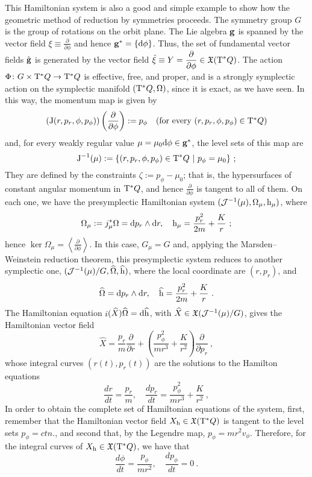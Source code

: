 \documentclass[12pt]{report}
\def\dst{\displaystyle}
\def\derpar#1#2{\frac{\partial{#1}}{\partial{#2}}}
\def\vf{\mathfrak X}
\def\d{{\rm d}}
\def\Tan{{\rm T}}
\def\inn{\mathop{i}\nolimits}
\begin{document}
This Hamiltonian system is also a good and simple example to show how the geometric method of reduction by symmetries proceeds.
The symmetry group $G$ is the group of rotations on the orbit plane.
The Lie algebra ${\bf g}$ is spanned by the vector field
$\displaystyle\xi\equiv\derpar{}{\phi}$ and hence ${\bf g}^*=\{\d\phi\}$.
Thus, the set of fundamental vector fields $\tilde{\bf g}$ is generated by
the vector field $\displaystyle\tilde\xi\equiv Y=\derpar{}{\phi}\in\vf(\Tan^*Q)$.
The action $\Phi\colon G\times\Tan^*Q\to\Tan^*Q$ is effective, free, and proper,
and is a strongly symplectic action on the symplectic manifold $(\Tan^*Q,\Omega)$, since it is exact, as we have seen.
In this way, the momentum map is given by
$$
({\rm J}(r,p_r,\phi,p_\phi))\left(\derpar{}{\phi}\right):=p_\phi
\quad \mbox{\rm (for every $(r,p_r,\phi,p_\phi)\in\Tan^*Q$)}
$$
and, for every weakly regular value
$\mu =\mu_0\d\phi\in{\bf g}^*$, the level sets of this map are
$$
{\rm J}^{-1}(\mu):=\{ (r,p_r,\phi,p_\phi)\in\Tan^*Q\ \vert\ p_\phi=\mu_0\} \ ;
$$
They are defined by the constraints $\zeta :=p_\phi-\mu_0$;
that is, the hypersurfaces of constant angular momentum in $\Tan^*Q$,
and hence $\dst\derpar{}{\phi}$ is tangent to all of them.
On each one, we have the presymplectic Hamiltonian system
$({\cal J}^{-1}(\mu),\Omega_\mu,{\rm h}_\mu)$, where
$$
\Omega_\mu :=j_\mu^*\Omega=\d p_r\wedge\d r
,\quad
{\rm h}_\mu=\frac{p_r^2}{2m}+\frac{K}{r} \ ;
$$
hence $\displaystyle\ker\Omega_\mu=\left\langle\derpar{}{\phi}\right\rangle$.
In this case, $G_\mu=G$ and, applying the Marsden--Weinstein reduction theorem,
this presymplectic system reduces to another symplectic one,
$({\cal J}^{-1}(\mu )/G,\widehat\Omega,\widehat{\rm h})$,
where the local coordinate are $(r,p_r)$, and
$$
\widehat\Omega =\d p_r\wedge\d r
,\quad
\widehat{\rm h}=\frac{p_r^2}{2m}+\frac{K}{r} \ .
$$
The Hamiltonian equation $\inn(\widehat X)\widehat\Omega =\d\widehat{\rm h}$,
with $\widehat X\in\vf({\cal J}^{-1}(\mu)/G)$,
gives the Hamiltonian vector field
$$
\widehat X=\frac{p_r}{m}\derpar{}{r}+\left(\frac{p_\phi^2}{mr^3}+\frac{K}{r^2}\right)\derpar{}{p_r} \ ,
$$
whose integral curves $(r(t),p_r(t))$ are the solutions to the Hamilton equations
$$
\frac{dr}{dt}=\frac{p_r}{m} ,\quad 
\frac{dp_r}{dt}=\frac{p_\phi^2}{mr^3}+\frac{K}{r^2} \ ,
$$
In order to obtain the complete set of Hamiltonian equations of the system,
first, remember that the Hamiltonian vector field $X_{\rm h}\in\vf(\Tan^*Q)$ is tangent to the level sets $p_\phi=ctn.$, 
and second that, by the Legendre map, $p_\phi=mr^2v_\phi$.
Therefore, for the integral curves of $X_{\rm h}\in\vf(\Tan^*Q)$, we have that
$$
\frac{d\phi}{dt}=\frac{p_\phi}{mr^2} ,\quad
\frac{dp_\phi}{dt}=0 \ .
$$
\end{document}
